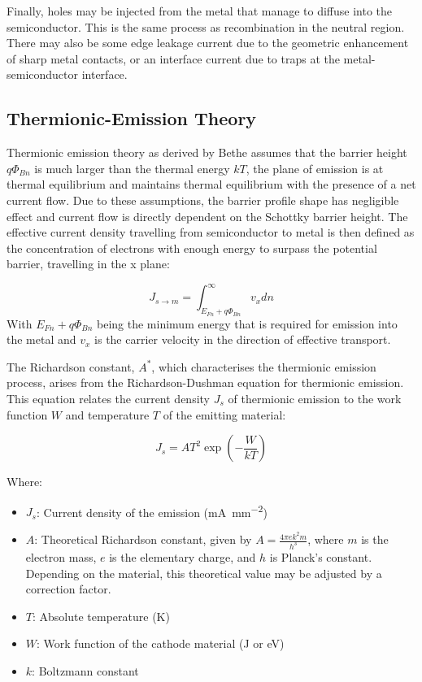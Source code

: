 Finally, holes may be injected from the metal that manage to diffuse into the semiconductor. This is the same process as recombination in the neutral region. There may also be some edge leakage current due to the geometric enhancement of sharp metal contacts, or an interface current due to traps at the metal-semiconductor interface.

\subsection{Thermionic-Emission Theory}
\label{sec:thermionic_emission_theory}
Thermionic emission theory as derived by Bethe assumes that the barrier height $q\Phi_{Bn}$ is much larger than the thermal energy $kT$, the plane of emission is at thermal equilibrium and maintains thermal equilibrium with the presence of a net current flow. Due to these assumptions, the barrier profile shape has negligible effect and current flow is directly dependent on the Schottky barrier height. The effective current density travelling from semiconductor to metal is then defined as the concentration of electrons with enough energy to surpass the potential barrier, travelling in the x plane:

\begin{equation}
	J_{s\rightarrow m} = \int_{E_{Fn}+q\Phi_{Bn}}^{\infty}v_{x}dn
	\label{eq:thermionic_emission1}
\end{equation}
With $E_{Fn}+q\Phi_{Bn}$ being the minimum energy that is required for emission into the metal and $v_{x}$ is the carrier velocity in the direction of effective transport.

The Richardson constant, \( A^{*} \), which characterises the thermionic emission process, arises from the Richardson-Dushman equation for thermionic emission.  This equation relates the current density \( J_s \) of thermionic emission to the work function \( W \) and temperature \( T \) of the emitting material:

\begin{equation}
    J_s = A T^{2} \exp\left(-\frac{W}{kT}\right)
\end{equation}

Where:
\begin{itemize}
    \item \( J_s \): Current density of the emission (\si{\milli\ampere\per\milli\meter\squared})
    \item \( A \): Theoretical Richardson constant, given by \( A = \frac{4\pi e k^{2} m}{h^{3}} \), where \( m \) is the electron mass, \( e \) is the elementary charge, and \( h \) is Planck's constant. Depending on the material, this theoretical value may be adjusted by a correction factor.
    \item \( T \): Absolute temperature (\si{\kelvin})
    \item \( W \): Work function of the cathode material (\si{\joule} or \si{\electronvolt})
    \item \( k \): Boltzmann constant
\end{itemize}

